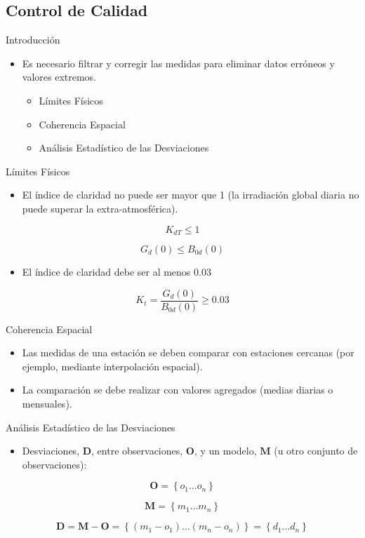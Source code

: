 \documentclass[xcolor={usenames,svgnames,dvipsnames}]{beamer}
\begin{document}
\subsection{Control de Calidad}
\label{sec:orgae6dcdd}
\begin{frame}[label={sec:org58f5391}]{Introducción}
\begin{itemize}
\item Es necesario filtrar y corregir las medidas para eliminar datos erróneos y valores extremos.
\begin{itemize}
\item Límites Físicos
\item Coherencia Espacial
\item Análisis Estadístico de las Desviaciones
\end{itemize}
\end{itemize}
\end{frame}

\begin{frame}[label={sec:orgfb4923c}]{Límites Físicos}
\begin{itemize}
\item El índice de claridad no puede ser mayor que 1 (la irradiación global diaria no puede superar la extra-atmosférica).
\end{itemize}
\[
  K_{dT} \leq 1
\]

\[
G_d(0) \leq B_{0d}(0)
\]

\begin{itemize}
\item El índice de claridad debe ser al menos 0.03
\end{itemize}
\[
K_t = \frac{G_d(0)}{B_{0d}(0)} \geq 0.03
\]
\end{frame}

\begin{frame}[label={sec:org8ef8822}]{Coherencia Espacial}
\begin{itemize}
\item Las medidas de una estación se deben comparar con \alert{estaciones cercanas} (por ejemplo, mediante interpolación espacial).
\item La comparación se debe realizar con \alert{valores agregados} (medias diarias o mensuales).
\end{itemize}
\end{frame}

\begin{frame}[label={sec:orge207278}]{Análisis Estadístico de las Desviaciones}
\begin{itemize}
\item Desviaciones, \(\mathbf{D}\), entre observaciones, \(\mathbf{O}\), y un modelo, \(\mathbf{M}\) (u otro conjunto de observaciones):
\end{itemize}

\[
\mathbf{O} = \left\{ o_1 \dots o_n \right\}
\]

\[
\mathbf{M} = \left\{ m_1 \dots m_n  \right\}
\]

\[
\mathbf{D} = \mathbf{M} - \mathbf{O} =  \left\{ (m_1 - o_1) \dots (m_n - o_n)  \right\} = \left\{ d_1 \dots d_n  \right\}
\]
\end{frame}
\end{document}
